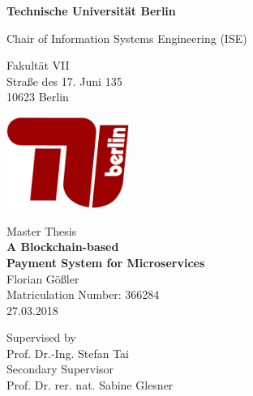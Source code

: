 \thispagestyle{empty}
\begin{center}

\vspace*{1.2cm}
{\LARGE \textbf{Technische Universit\"at Berlin}}

\vspace{0.5cm}

{\large Chair of Information Systems Engineering (ISE)\\[5mm]}

Fakult\"at VII\\
Stra\ss{}e des 17. Juni 135\\
10623 Berlin\\

\vspace*{1cm}

\includegraphics[width=4cm]{Images/tu_logo.jpg}

\vspace*{1.0cm}

{\large Master Thesis}\\

\vspace{1.0cm}
{\LARGE \textbf{A Blockchain-based}}\\
\vspace*{0.25cm}
{\LARGE \textbf{Payment System for Microservices}}\\
\vspace*{1.0cm}
{\LARGE Florian G\"o\ss{}ler}
\\
\vspace*{0.5cm}
Matriculation Number: 366284\\
27.03.2018\\ %
\vspace*{1.0cm}

Supervised by\\
Prof. Dr.-Ing. Stefan Tai\\
\vspace*{0.5cm}
Secondary Supervisor\\
Prof. Dr. rer. nat. Sabine Glesner
\vspace{3cm}

\end{center}
